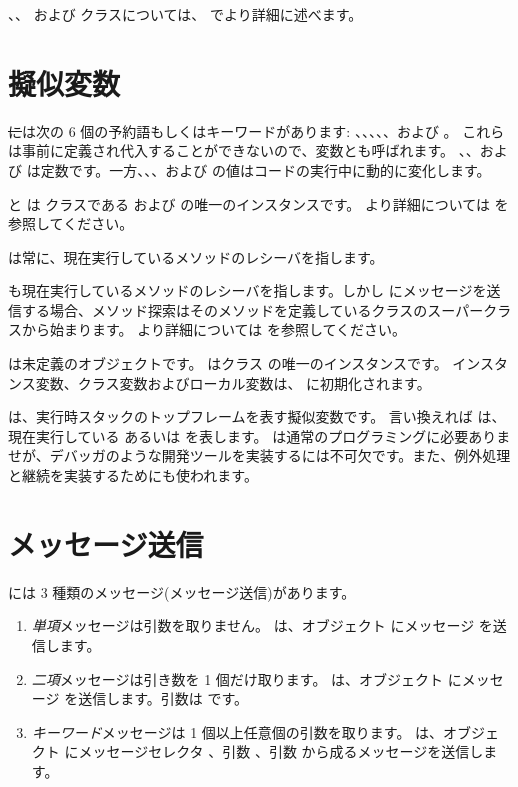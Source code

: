 \documentclass[a4paper,10pt,twoside]{book}
\begin{document}
、、 および  クラスについては、 でより詳細に述べます。


\section{擬似変数}

\st には次の 6 個の予約語もしくはキーワードがあります:
、、、、、および 。
これらは事前に定義され代入することができないので、変数とも呼ばれます。
、、および  は定数です。一方、、、および  の値はコードの実行中に動的に変化します。

 と  は  クラスである  および  の唯一のインスタンスです。
より詳細については  を参照してください。

 は常に、現在実行しているメソッドのレシーバを指します。

 も現在実行しているメソッドのレシーバを指します。しかし \super にメッセージを送信する場合、メソッド探索はそのメソッドを定義しているクラスのスーパークラスから始まります。
より詳細については  を参照してください。

 は未定義のオブジェクトです。
 はクラス  の唯一のインスタンスです。
インスタンス変数、クラス変数およびローカル変数は、 に初期化されます。

 は、実行時スタックのトップフレームを表す擬似変数です。
言い換えれば は、現在実行している  あるいは  を表します。
 は通常のプログラミングに必要ありませが、デバッガのような開発ツールを実装するには不可欠です。また、例外処理と継続を実装するためにも使われます。

\section{メッセージ送信}

\pharo には 3 種類のメッセージ(メッセージ送信)があります。
\begin{enumerate}
  \item \emph{単項}メッセージは引数を取りません。
  は、オブジェクト  にメッセージ  を送信します。
  \item \emph{二項}メッセージは引き数を 1 個だけ取ります。
  	 は、オブジェクト  にメッセージ \ct{+} を送信します。引数は  です。
  \item \emph{キーワード}メッセージは 1 個以上任意個の引数を取ります。
  	 は、オブジェクト  にメッセージセレクタ
	、引数 、引数  から成るメッセージを送信します。
\end{enumerate}
\end{document}
